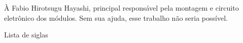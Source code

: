 \documentclass[twosideprint]{politex}
\begin{document}
\newcommand{\wwifi}{\emph{WiFi}}
\newcommand{\wmqtt}{\emph{MQTT}}
\newcommand{\wid}{\emph{ID}}
\newcommand{\wiot}{\emph{IoT}}

\capa
\newpage\mbox{}

\falsafolhaderosto
\newpage\mbox{}

\folhaderosto







\begin{agradecimentos}

À Fabio Hirotsugu Hayashi, principal responsável pela montagem e circuito eletrônico dos módulos. Sem sua ajuda, esse trabalho não seria possível.
\end{agradecimentos}








\newpage\mbox{}\newpage

\newpage\mbox{}\newpage
\listadefiguras
\listadetabelas

\begin{pretextualsection}{Lista de siglas}

\end{pretextualsection}
\end{document}
